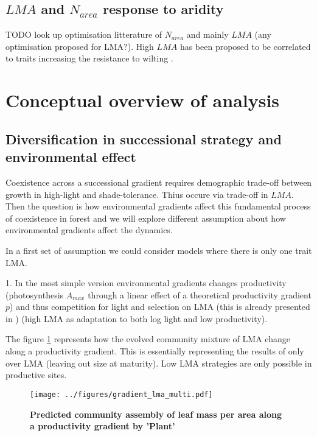 \documentclass[a4paper,11pt]{article}
\begin{document}
\subsection{$LMA$ and $N_{area}$ response to aridity}

TODO look up optimisation litterature of $N_{area}$ and mainly $LMA$ (any optimisation proposed for LMA?). High $LMA$ has been proposed to be correlated to traits increasing the resistance to wilting \citep{Wright-2002b}.



\section{Conceptual overview of analysis}

\subsection{Diversification in successional strategy and environmental effect}

Coexistence across a successional gradient requires demographic trade-off between growth in high-light and shade-tolerance. Thius occure via trade-off in $LMA$. Then the question is how environmental gradients affect this fundamental process of coexistence in forest and we will explore different assumption about how environmental gradients affect the dynamics.

In a first set of assumption we could consider models where there is only one trait LMA.

\clearpage

1. In the most simple version environmental gradients changes productivity (photosynthesis $A_{max}$ through a linear effect of a theoretical productivity gradient $p$) and
thus competition for light and selection on LMA (this is already presented in \citet{Falster-2017}) (high LMA as adaptation to both log light and low productivity).

The figure \ref{fig:lma} represents how the evolved community mixture of LMA change along a productivity gradient. This is essentially representing the results of \citet{Falster-2017} only over LMA (leaving out size at maturity). Low LMA strategies are only possible in productive sites.

\begin{figure}[ht]
\centering
\texttt{[image: ../figures/gradient\_lma\_multi.pdf]}
\caption{\textbf{Predicted community assembly of leaf mass per area along a productivity gradient by 'Plant' \citep[see][]{Falster-2016}}
\label{fig:lma}}
\end{figure}
\end{document}
